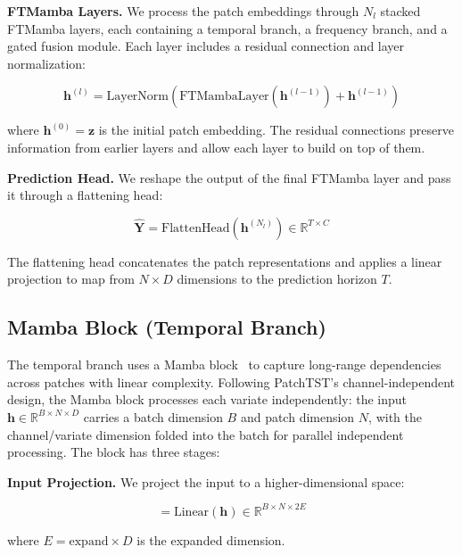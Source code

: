 \documentclass[electronics,article,submit,pdftex,moreauthors]{Definitions/mdpi}
\begin{document}
\textbf{FTMamba Layers.} We process the patch embeddings through $N_l$ stacked FTMamba layers, each containing a temporal branch, a frequency branch, and a gated fusion module. Each layer includes a residual connection and layer normalization:
\begin{linenomath}
\begin{equation}
\mathbf{h}^{(l)} = \text{LayerNorm}(\text{FTMambaLayer}(\mathbf{h}^{(l-1)}) + \mathbf{h}^{(l-1)})
\end{equation}
\end{linenomath}
where $\mathbf{h}^{(0)} = \mathbf{z}$ is the initial patch embedding. The residual connections preserve information from earlier layers and allow each layer to build on top of them.

\textbf{Prediction Head.} We reshape the output of the final FTMamba layer and pass it through a flattening head:
\begin{linenomath}
\begin{equation}
\hat{\mathbf{Y}} = \text{FlattenHead}(\mathbf{h}^{(N_l)}) \in \mathbb{R}^{T \times C}
\end{equation}
\end{linenomath}
The flattening head concatenates the patch representations and applies a linear projection to map from $N \times D$ dimensions to the prediction horizon $T$.

\subsection{Mamba Block (Temporal Branch)}

The temporal branch uses a Mamba block~\cite{ref10} to capture long-range dependencies across patches with linear complexity. Following PatchTST's channel-independent design, the Mamba block processes each variate independently: the input $\mathbf{h} \in \mathbb{R}^{B \times N \times D}$ carries a batch dimension $B$ and patch dimension $N$, with the channel/variate dimension folded into the batch for parallel independent processing. The block has three stages:

\textbf{Input Projection.} We project the input to a higher-dimensional space:
\begin{linenomath}
\begin{equation}
[\mathbf{x}, \mathbf{res}] = \text{Linear}(\mathbf{h}) \in \mathbb{R}^{B \times N \times 2E}
\end{equation}
\end{linenomath}
where $E = \text{expand} \times D$ is the expanded dimension.
\end{document}
